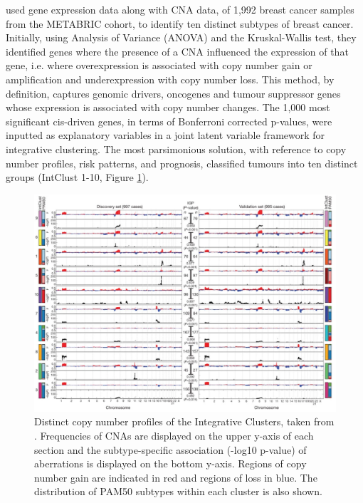 \cite{pmid22522925} used gene expression data along with CNA data, of 1,992 breast cancer samples from the METABRIC cohort, to identify ten distinct subtypes of breast cancer. Initially, using Analysis of Variance (ANOVA) and the Kruskal-Wallis test, they identified genes where the presence of a CNA influenced the expression of that gene, i.e. where overexpression is associated with copy number gain or amplification and underexpression with copy number loss. This method, by definition, captures genomic drivers, oncogenes and tumour suppressor genes whose expression is associated with copy number changes. The 1,000 most significant cis-driven genes, in terms of Bonferroni corrected p-values, were inputted as explanatory variables in a joint latent variable framework for integrative clustering. The most parsimonious solution, with reference to copy number profiles, risk patterns, and prognosis, classified tumours into ten distinct groups (IntClust 1-10, Figure \ref{fig:fig.IC}). %

\begin{figure}[h]
\includegraphics[width = 1\textwidth]{../figures/Chapter_2/IntClust_Profiles_Curtis.png}
\caption[Distinct copy number profiles of the Integrative Clusters, taken from \cite{pmid22522925}.]{Distinct copy number profiles of the Integrative Clusters, taken from \cite{pmid22522925}. Frequencies of CNAs are displayed on the upper y-axis of each section and the subtype-specific association (-log10 p-value) of aberrations is displayed on the bottom y-axis. Regions of copy number gain are indicated in red and regions of loss in blue. The distribution of PAM50 subtypes within each cluster is also shown.}
\label{fig:fig.IC}
\end{figure}

